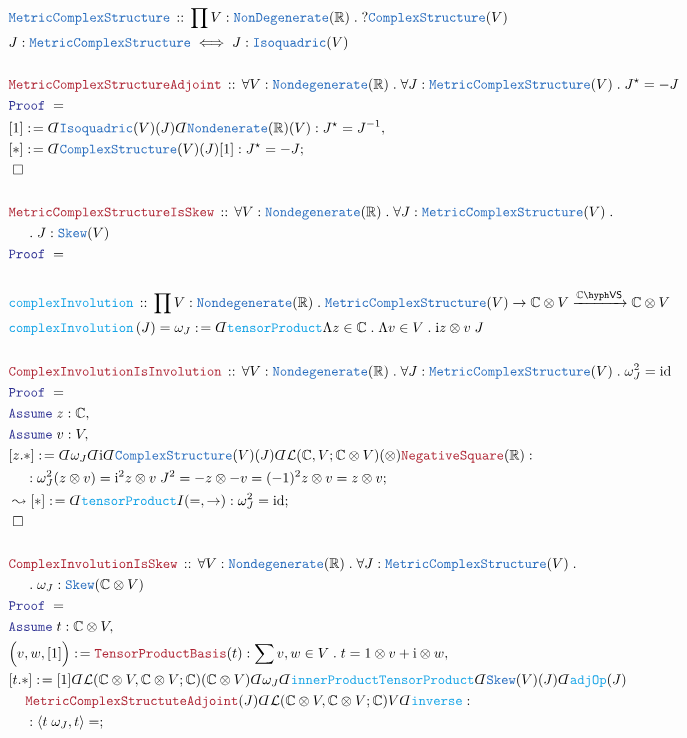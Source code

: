 \documentclass[12pt]{scrartcl}%
\newcommand{\TYPE}[1]{\textcolor{NavyBlue}{\mathtt{#1}}}%
\newcommand{\FUNC}[1]{\textcolor{Cerulean}{\mathtt{#1}}}%
\newcommand{\LOGIC}[1]{\textcolor{Blue}{\mathtt{#1}}}%
\newcommand{\THM}[1]{\textcolor{Maroon}{\mathtt{#1}}}%
\renewcommand{\.}{\; . \;} %
\newcommand{\de}{: \kern 0.1pc =} %
\newcommand{\Act}[1]{\left( #1 \right)} %
\newcommand{\Theorem}[2]{& \THM{#1} \, :: \, #2 \\ & \Proof = \\ } %
\newcommand{\DeclareType}[2]{& \TYPE{#1} \, :: \, #2 \\}%
\newcommand{\DefineType}[3]{& #1 : \TYPE{#2} \iff #3 \\}%
\newcommand{\DeclareFunc}[2]{& \FUNC{#1} \, :: \, #2 \\}%
\newcommand{\DefineNamedFunc}[4]{&  \FUNC{#1}\Act{#2} = #3 \de #4 \\}%
\newcommand{\NewLine}{\\ & \kern 1pc}%
\newcommand{\Page}[1]{ \begin{align*} #1 \end{align*}  }%
\newcommand{ \bd }{ \ByDef }%
\newcommand{\Reals}{\mathbb{R}}%
\newcommand{\Complex}{\mathbb{C}}%
\DeclareMathOperator*{\id}{id}%
\newcommand{\Say}[3]{& #1 \de #2 : #3, \\} %
\newcommand{\Conclude}[3]{& #1 \de #2 : #3; \\}%
\newcommand{\DeriveConclude}[3]{& \leadsto #1 \de #2 : #3 ; \\} %
\newcommand{\Assume}[2]{& \LOGIC{Assume} \; #1 : #2, \\} %
\newcommand{\QED}{\; \square} %
\newcommand{\EndProof}{& \QED \\} %
\newcommand{\ByDef}{\rotatebox[origin=c]{-180}{$D$}}%
\newcommand{\Proof}{\LOGIC{Proof} \; } %
\newcommand{\Arrow}[1]{\xrightarrow{#1}}%
\newcommand{\VS}[1]{#1\hyph\mathsf{VS}} %
\renewcommand{\L}{\mathcal{L}}
\begin{document}
\Page{
	\DeclareType{MetricComplexStructure}
	{
		\prod V : \TYPE{NonDegenerate}(\Reals) \.
		?\TYPE{ComplexStructure}(V)
	}
	\DefineType{J}{MetricComplexStructure}
	{J : \TYPE{Isoquadric}(V)}
	\\
	\Theorem{MetricComplexStructureAdjoint}
	{
		\forall V : \TYPE{Nondegenerate}(\Reals) \.
		\forall J : \TYPE{MetricComplexStructure}(V) \. 
		J^\star = -J
	}
	\Say{[1]}{\bd \TYPE{Isoquadric}(V)(J)\bd \TYPE{Nondenerate}(\Reals)(V)}
	{J^\star = J^{-1}}
	\Conclude{[*]}{\bd \TYPE{ComplexStructure}(V)(J)[1]}
	{
		J^{\star} = - J
	}
	\EndProof
	\\
	\Theorem{MetricComplexStructureIsSkew}
	{
		\forall V : \TYPE{Nondegenerate}(\Reals) \.
		\forall J : \TYPE{MetricComplexStructure}(V) \.
		\NewLine \.
		J : \TYPE{Skew}(V)
	}
	\\
	\DeclareFunc{complexInvolution}
	{
		\prod V : \TYPE{Nondegenerate}(\Reals) \.
		\TYPE{MetricComplexStructure}(V) \to
		\Complex \otimes V 
		\Arrow{\VS{\Complex}}
		\Complex \otimes V
	}
	\DefineNamedFunc{complexInvolution}{J}{\omega_J}
	{
		\bd \FUNC{tensorProduct} 
		\Lambda z \in \Complex \. 
		\Lambda v \in V \.
		\mathrm{i}z \otimes v\;J
	}
	\\
	\Theorem{ComplexInvolutionIsInvolution}
	{
		\forall V : \TYPE{Nondegenerate}(\Reals) \.
		\forall J : \TYPE{MetricComplexStructure}(V) \. 
		\omega_J^2 = \id
	}
	\Assume{z}{\Complex}
	\Assume{v}{V}
	\Conclude{[z.*]}
	{
		\bd \omega_J 
		\bd \mathrm{i} \bd \TYPE{ComplexStructure}(V)(J)
		\bd \L(\Complex,V;\Complex \otimes V)(\otimes)
		\THM{NegativeSquare}(\Reals)
	}
	{
		\NewLine : 
		\omega^2_J(z \otimes v) = 
		\mathrm{i}^2 z \otimes v \; J^2 = 
		- z \otimes -v =
		(-1)^2 z \otimes v =
		z \otimes v
	}
	\DeriveConclude{[*]}{\bd \FUNC{tensorProduct}I(=,\to)}{\omega_J^2 = \id}
	\EndProof
	\\
	\Theorem{ComplexInvolutionIsSkew}
	{
		\forall V : \TYPE{Nondegenerate}(\Reals) \.
		\forall J : \TYPE{MetricComplexStructure}(V) \. 
		\NewLine \. 
		\omega_J : \TYPE{Skew}(\Complex \otimes V)
	}
	\Assume{t}{\Complex \otimes V}
	\Say{\Big( v,w,[1] \Big)}{\THM{TensorProductBasis}(t)}
	{
		\sum v,w \in V \. t = 1 \otimes v + \mathrm{i} \otimes w
	}
	\Conclude{[t.*]}{
		[1]
		\bd \L(\Complex \otimes V,\Complex \otimes V; \Complex)
		(\Complex \otimes V)
		\bd \omega_J
		\bd \FUNC{innerProductTensorProduct}
		\bd \TYPE{Skew}(V)(J)
		\bd \FUNC{adjOp}(J) \NewLine
		\THM{MetricComplexStructuteAdjoint}(J)
		\bd \L(\Complex \otimes V,\Complex \otimes V; \Complex)V
		\bd \FUNC{inverse}
		}
	{
	\NewLine :
	\langle t \; \omega_J, t  \rangle = 
}}
\end{document}
